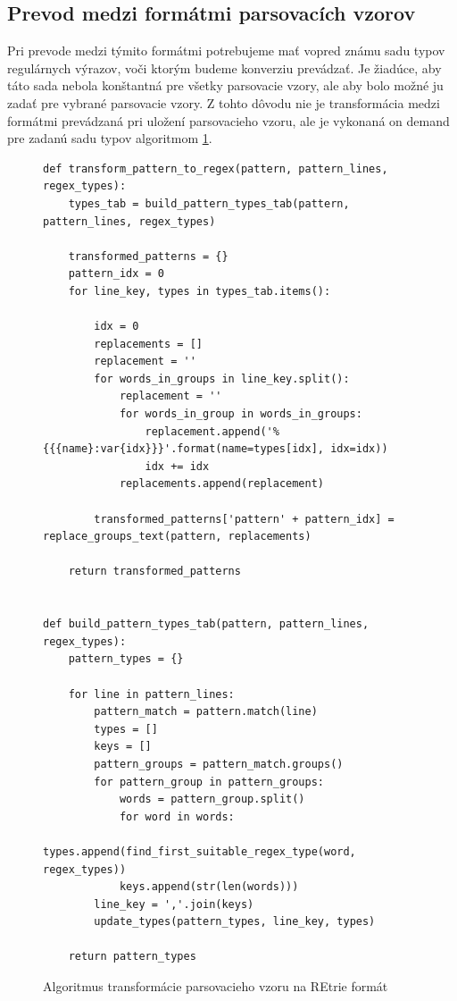 \subsection{Prevod medzi formátmi parsovacích vzorov}
\label{sec:format-transformation}

Pri prevode medzi týmito formátmi potrebujeme mať vopred známu sadu typov regulárnych výrazov, voči ktorým budeme konverziu prevádzať. Je žiadúce, aby táto sada nebola konštantná pre všetky parsovacie vzory, ale aby bolo možné ju zadať pre vybrané parsovacie vzory. Z tohto dôvodu nie je transformácia medzi formátmi prevádzaná pri uložení parsovacieho vzoru, ale je vykonaná on demand pre zadanú sadu typov algoritmom \ref{fig:pattern-transformation}.

\begin{figure}[htbp]
\centering
\begin{minipage}{0.9\textwidth}
\lstset{tabsize=4,columns=flexible,breaklines=true,breakatwhitespace=true, showstringspaces=false}
\begin{lstlisting}
def transform_pattern_to_regex(pattern, pattern_lines, regex_types):
    types_tab = build_pattern_types_tab(pattern, pattern_lines, regex_types)

    transformed_patterns = {}
    pattern_idx = 0
    for line_key, types in types_tab.items():

        idx = 0
        replacements = []
        replacement = ''
        for words_in_groups in line_key.split():
            replacement = ''
            for words_in_group in words_in_groups:
                replacement.append('%{{{name}:var{idx}}}'.format(name=types[idx], idx=idx))
                idx += idx
            replacements.append(replacement)
            
        transformed_patterns['pattern' + pattern_idx] = replace_groups_text(pattern, replacements)

    return transformed_patterns


def build_pattern_types_tab(pattern, pattern_lines, regex_types):
    pattern_types = {}

    for line in pattern_lines:
        pattern_match = pattern.match(line)
        types = []
        keys = []
        pattern_groups = pattern_match.groups()
        for pattern_group in pattern_groups:
            words = pattern_group.split()
            for word in words:
                types.append(find_first_suitable_regex_type(word, regex_types))
            keys.append(str(len(words)))
        line_key = ','.join(keys)
        update_types(pattern_types, line_key, types)

    return pattern_types
\end{lstlisting} 		
\end{minipage} 
\caption{Algoritmus transformácie parsovacieho vzoru na REtrie formát}
\label{fig:pattern-transformation}
\end{figure}

